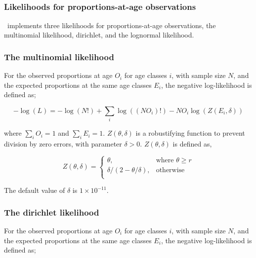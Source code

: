 {{{{\begin{itemize}
\end{itemize}

\subsection{\label{sec:likelihood-observations}}
\subsubsection{Likelihoods for proportions-at-age observations}
\CNAME\ implements three likelihoods for proportions-at-age observations, the multinomial likelihood, dirichlet, and the lognormal likelihood. 

\subsubsection*{The multinomial likelihood}
For the observed proportions at age $O_i$ for age classes $i$, with sample size $N$, and the expected proportions at the same age classes $E_i$, the negative log-likelihood is defined as; 

\begin{equation}
-\log \left(L \right) =  -\log \left(N! \right) + \sum\limits_i \log \left( \left(NO_i \right)! \right) - NO_i \log \left(Z \left(E_i,\delta \right) \right)
\end{equation}

where $\sum\limits_i O_i = 1$ and $\sum\limits_i E_i = 1$. $Z \left(\theta,\delta \right)$ is a robustifying function to prevent division by zero errors, with parameter $\delta>0$. $Z \left(\theta,\delta \right)$ is defined as,

\begin{equation}
Z \left(\theta,\delta \right) = \begin{cases}
\theta, & \text{where $\theta \ge r$} \\
\delta/\left( 2-\theta/\delta \right), & \text{otherwise} \\  
\end{cases}
\end{equation}

The default value of $\delta$ is $1 \times 10^{-11}$.
\subsubsection*{The dirichlet likelihood}

For the observed proportions at age $O_i$ for age classes $i$, with sample size $N$, and the expected proportions at the same age classes $E_i$, the negative log-likelihood is defined as; 

}}}}
